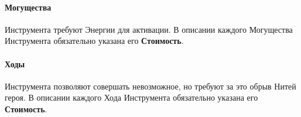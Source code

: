 \paragraph{Могущества }Инструмента требуют Энергии для активации. В описании каждого Могущества Инструмента обязательно указана его \textbf{Стоимость}.
\paragraph{Ходы }Инструмента позволяют совершать невозможное, но требуют за это обрыв Нитей героя. В описании каждого Хода Инструмента обязательно указана его \textbf{Стоимость}.

